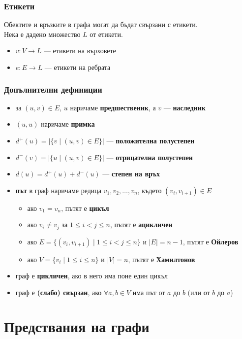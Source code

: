 \documentclass[alsotrans,beameroptions={aspectratio=169}]{beamerswitch}
\begin{document}
\begin{frame}
  \frametitle{Етикети}
  Обектите и връзките в графа могат да бъдат свързани с етикети.\\[1em]
  \pause
  Нека е дадено множество $L$ от етикети.
  \begin{itemize}
  \item $v : V \rightarrow L$ --- етикети на върховете
  \item $e : E \rightarrow L$ --- етикети на ребрата
  \end{itemize}
\end{frame}

\begin{frame}
  \frametitle{Допълнителни дефиниции}
  \begin{itemize}[<+->]
  \item за $(u, v)\in E$, $u$ наричаме \textbf{предшественик}, а $v$ --- \textbf{наследник}
  \item $(u, u)$ наричаме \textbf{примка}
  \item $d^+(u) = |\{ v\;|\;(u, v) \in E\}|$ --- \textbf{положителна полустепен}
  \item $d^-(v) = |\{ u\;|\;(u, v) \in E\}|$ --- \textbf{отрицателна полустепен}
  \item $d(u) = d^+(u) + d^-(u)$ --- \textbf{степен на връх}
  \item \textbf{път} в граф наричаме редица $v_1, v_2, \ldots, v_n$, където $(v_i, v_{i+1}) \in E$
    \begin{itemize}
    \item ако $v_1 = v_n$, пътят е \textbf{цикъл}
    \item ако $v_i \neq v_j$ за $1 \leq i < j \leq n$, пътят е \textbf{ацикличен}
    \item ако $E = \{(v_i,v_{i+1})\;|\;1 \leq i < j \leq n\}$ и $|E| = n - 1$, пътят е \textbf{Ойлеров}
    \item ако $V = \{v_i\;|\;1 \leq i \leq n\}$ и $|V| = n$, пътят е \textbf{Хамилтонов}
    \end{itemize}
  \item граф е \textbf{цикличен}, ако в него има поне един цикъл
  \item граф е \textbf{(слабо) свързан}, ако $\forall a, b\in V$ има път от $a$ до $b$ (или от $b$ до $a$)
  \end{itemize}
\end{frame}

\section{Предствания на графи}
\end{document}
